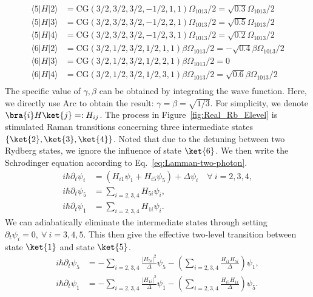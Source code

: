 \documentclass[11pt]{article}
\begin{document}
\begin{align*}
\langle 5| H | 2 \rangle &= \text{CG}(3/2,3/2,3/2,-1/2,1,1)\Omega_{1013}/2 = \sqrt{0.3}\Omega_{1013}/2   \\
\langle 5| H | 3 \rangle &= \text{CG}(3/2,3/2,3/2,-1/2,2,1)\Omega_{1013}/2= \sqrt{0.5}\Omega_{1013}/2   \\
\langle 5| H | 4 \rangle &= \text{CG}(3/2,3/2,3/2,-1/2,3,1)\Omega_{1013}/2= \sqrt{0.2}\Omega_{1013}/2  \\
\langle 6| H | 2 \rangle &= \text{CG}(3/2,1/2,3/2,1/2,1,1) \beta \Omega_{1013}/2= -\sqrt{0.4}\beta\Omega_{1013}/2  \\
\langle 6| H | 3 \rangle &= \text{CG}(3/2,1/2,3/2,1/2,2,1) \beta \Omega_{1013}/2= 0  \\
\langle 6| H | 4 \rangle &= \text{CG}(3/2,1/2,3/2,1/2,3,1) \beta \Omega_{1013}/2= \sqrt{0.6}\beta\Omega_{1013}/2 \\
\end{align*}
The specific value of $\gamma,\beta$ can be obtained by integrating the wave function. Here, we directly use Arc to obtain the result: $\gamma = \beta = \sqrt{1/3}$.
For simplicity,  we denote $\bra{i}H\ket{j} =: H_{ij}$. The process in Figure~\ref{fig:Real_Rb_Elevel} is stimulated Raman transitions concerning three intermediate states $\{\ket{2},\ket{3},\ket{4}\}$. Noted that due to the detuning between two Rydberg states, we ignore the influence of state $\ket{6}$. We then write the Schrodinger equation according to Eq.~\eqref{eq:Lamman-two-photon}.
\begin{align}
    i\hbar \partial_t \psi_i &= (H_{i1} \psi_1 + H_{i5}\psi_5) + \Delta \psi_i \quad \forall~i = 2,3,4, \\ 
    i\hbar\partial_t \psi_5 &= \sum_{i = 2,3,4} H_{5i} \psi_i,\\
    i\hbar\partial_t \psi_1 &=  \sum_{i = 2,3,4} H_{1i} \psi_i.
\end{align}
We can adiabatically eliminate the intermediate states through setting $\partial_t \psi_i = 0,~\forall~i = 3,4,5$. This then give the effective two-level transition between state $\ket{1}$ and state $\ket{5}$.
\begin{align}
    i\hbar\partial_t \psi_5&=  -\sum_{i = 2,3,4} \frac{|H_{5i}|^2}{\Delta} \psi_5 - \left(\sum_{i = 2,3,4} \frac{H_{i1} H_{5i}}{\Delta}\right) \psi_1  ,\\
      i\hbar\partial_t \psi_1 &=  -\sum_{i = 2,3,4} \frac{|H_{1i}|^2}{\Delta} \psi_1 - \left(\sum_{i = 2,3,4} \frac{H_{i5} H_{1i}}{\Delta}\right) \psi_5  .
\end{align}
\end{document}
